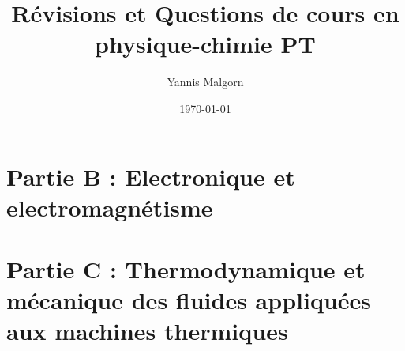 \documentclass{article}
\title{Révisions et Questions de cours en physique-chimie PT}
\author{Yannis Malgorn}
\date{\today}
\begin{document}
\maketitle
\newpage

\section*{\centering\huge Partie B : Electronique et electromagnétisme} 


\section*{\centering\huge Partie C : Thermodynamique et mécanique des fluides appliquées aux machines thermiques}

\end{document}

